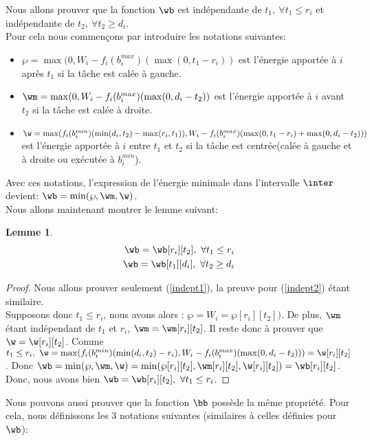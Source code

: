 \documentclass{report}
\newcommand{\bmin}{b_i^{min}}
\newcommand{\bmax}{b_i^{max}}
\newtheorem{Lem}{Lemme}
\begin{document}
Nous allons prouver que la fonction $\wb$ est indépendante de $t_1,\ 
\forall t_1 \le r_i$ et indépendante de $t_2,\ \forall t_2 \ge d_i$.\\

Pour cela nous commençons par introduire les notations suivantes:
\begin{itemize}
\item $\wp=\max(0,W_i-f_i(\bmax)(\max(0,t_1-r_i))$ est l'énergie apportée à $i$ 
  après $t_1$ si la tâche est calée à gauche.
\item $\wm =\max(0,W_i-f_i(\bmax)(\max(0,d_i-t_2))$ est l'énergie apportée à $i$ 
  avant $t_2$ si la tâche est calée à droite.	
\item $\w =\max(f_i(\bmin)(\min(d_i,t_2)-\max(r_i,t_1)),
  W_i-f_i(\bmax)(\max(0,t_1-r_i)+\max(0,d_i-t_2)))$ est l'énergie apportée à $i$ 
  entre $t_1$ et $t_2$ si la tâche est centrée(calée à gauche et à droite ou 
  exécutée à $\bmin$).\\
\end{itemize}


Avec ces notations, l'expression de l'énergie minimale dans l'intervalle 
$\inter$ devient: $\wb=\min(\wp,\wm,\w)$.\\

Nous allons maintenant montrer le lemme suivant:
\begin{Lem}
  \begin{align}
    \wb=\wb[r_i][t_2],\ \forall t_1\le r_i \label{indept1}\\
    \wb=\wb[t_1][d_i],\ \forall t_2\ge d_i \label{indept2}
  \end{align}
\end{Lem}

\begin{proof}
  Nous allons prouver seulement (\ref{indept1}), la preuve pour (\ref{indept2}) 
  étant similaire.\\
  Supposons donc $t_1\le r_i$, nous avons alors :
  $\wp=W_i=\wp[r_i][t_2])$. De plus, $\wm$ étant indépendant de $t_1$ et $r_i$, 
  $\wm=\wm[r_i][t_2]$. Il reste donc à prouver que $\w=\w[r_i][t_2]$. Comme 
  $t_1\le r_i,\ \w=\max(f_i(\bmin)(\min(d_i,t_2)- r_i) , W_i-f_i(\bmax)(\max(0,d_i-t_2)))=
  \w[r_i][t_2]$. Donc $\wb=\min(\wp,\wm,\w)=\min(\wp[r_i][t_2],\wm[r_i][t_2],
  \w[r_i][t_2])=\wb[r_i][t_2]$. Donc, nous avons bien $\wb=\wb[r_i][t_2],\ 
  \forall t_1\le r_i$.
  
\end{proof}

Nous pouvons aussi prouver que la fonction $\bb$ possède la même propriété. Pour cela, nous définissons les 3 notations suivantes (similaires à celles définies pour $\wb$):
\end{document}
